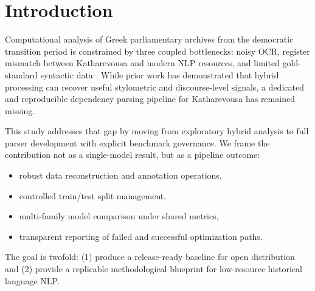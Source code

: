 \section{Introduction}

Computational analysis of Greek parliamentary archives from the democratic transition period is constrained by three coupled bottlenecks: noisy OCR, register mismatch between Katharevousa and modern NLP resources, and limited gold-standard syntactic data \cite{barmpounis2024,fitsilis2024}. While prior work has demonstrated that hybrid processing can recover useful stylometric and discourse-level signals, a dedicated and reproducible dependency parsing pipeline for Katharevousa has remained missing.

This study addresses that gap by moving from exploratory hybrid analysis to full parser development with explicit benchmark governance. We frame the contribution not as a single-model result, but as a pipeline outcome:
\begin{itemize}[leftmargin=1.25em]
  \item robust data reconstruction and annotation operations,
  \item controlled train/test split management,
  \item multi-family model comparison under shared metrics,
  \item transparent reporting of failed and successful optimization paths.
\end{itemize}

The goal is twofold: (1) produce a release-ready baseline for open distribution and (2) provide a replicable methodological blueprint for low-resource historical language NLP.
